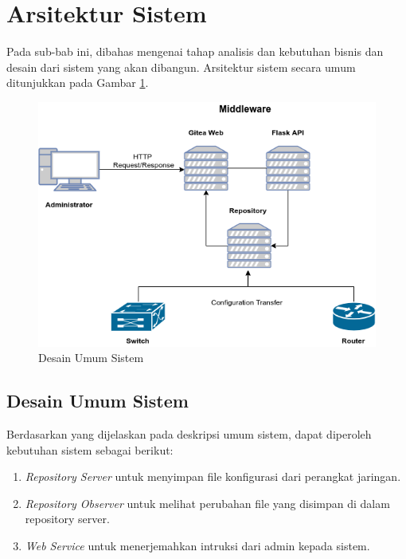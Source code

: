 	\section{Arsitektur Sistem}
		Pada sub-bab ini, dibahas mengenai tahap analisis dan kebutuhan bisnis dan desain dari sistem yang akan dibangun. Arsitektur sistem secara umum ditunjukkan pada Gambar \ref{DesainUmumSistem}.\\
		\begin{figure}[H]
			\centering
			\includegraphics[width=\textwidth]{Images/C-3/Desain-Umum-TA-2.png}
			\caption{Desain Umum Sistem}
			\label{DesainUmumSistem}
		\end{figure}

		\subsection{Desain Umum Sistem}
			Berdasarkan yang dijelaskan pada deskripsi umum sistem, dapat diperoleh kebutuhan sistem sebagai berikut:
			\begin{enumerate}
				\item \textit{Repository Server} untuk menyimpan file konfigurasi dari perangkat jaringan.
				\item \textit{Repository Observer} untuk melihat perubahan file yang disimpan di dalam repository server.
				\item \textit{Web Service} untuk menerjemahkan intruksi dari admin kepada sistem.
			\end{enumerate}
                
                
